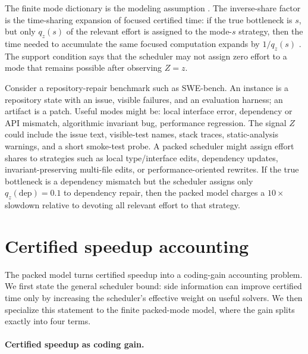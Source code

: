 \documentclass{article}
\newcounter{algorithm}
\begin{document}
The finite mode dictionary is the modeling assumption .  The inverse-share factor is the
time-sharing expansion of focused certified time: if the true bottleneck is \(s\), but only
\(q_z(s)\) of the relevant effort is assigned to the mode-\(s\) strategy, then the time needed
to accumulate the same focused computation expands by \(1/q_z(s)\) .
The support condition says that the scheduler may not assign zero effort to a mode that
remains possible after observing \(Z=z\).

Consider a repository-repair benchmark such as SWE-bench.  An instance is a repository
state with an issue, visible failures, and an evaluation harness; an artifact is a patch.
Useful modes might be: local interface error, dependency or API mismatch, algorithmic invariant bug, performance regression.
The signal \(Z\) could include the issue text, visible-test names, stack traces, static-analysis
warnings, and a short smoke-test probe.  A packed scheduler might assign effort shares to
strategies such as local type/interface edits, dependency updates, invariant-preserving
multi-file edits, or performance-oriented rewrites.  If the true bottleneck is a dependency
mismatch but the scheduler assigns only \(q_z(\mathrm{dep})=0.1\) to dependency repair,
then the packed model charges a \(10\times\) slowdown relative to devoting all relevant
effort to that strategy.

\section{Certified speedup accounting}
\label{sec:accounting}

The packed model turns certified speedup into a coding-gain accounting problem.
We first state the general scheduler bound: side information can improve certified time
only by increasing the scheduler's effective weight on useful solvers.  We then specialize
this statement to the finite packed-mode model, where the gain splits exactly into four terms.

\paragraph{Certified speedup as coding gain.}
\end{document}
